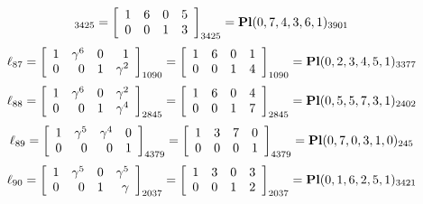 \documentclass{article}
\begin{document}
{$$_{3425}
=
\left[
\begin{array}{*{4}c}
1  & 6  & 0  & 5\\
0  & 0  & 1  & 3\\
\end{array}
\right]_{3425}
={\rm\bf Pl}(0,7,4,3,6,1 )_{3901}$$
$$
\ell_{87} = 
\left[
\begin{array}{*{4}{r}}
1 & \gamma^{6} & 0 & 1\\
0 & 0 & 1 & \gamma^{2}\\
\end{array}
\right]
_{1090}
=
\left[
\begin{array}{*{4}c}
1  & 6  & 0  & 1\\
0  & 0  & 1  & 4\\
\end{array}
\right]_{1090}
={\rm\bf Pl}(0,2,3,4,5,1 )_{3377}$$
$$
\ell_{88} = 
\left[
\begin{array}{*{4}{r}}
1 & \gamma^{6} & 0 & \gamma^{2}\\
0 & 0 & 1 & \gamma^{4}\\
\end{array}
\right]
_{2845}
=
\left[
\begin{array}{*{4}c}
1  & 6  & 0  & 4\\
0  & 0  & 1  & 7\\
\end{array}
\right]_{2845}
={\rm\bf Pl}(0,5,5,7,3,1 )_{2402}$$
$$
\ell_{89} = 
\left[
\begin{array}{*{4}{r}}
1 & \gamma^{5} & \gamma^{4} & 0\\
0 & 0 & 0 & 1\\
\end{array}
\right]
_{4379}
=
\left[
\begin{array}{*{4}c}
1  & 3  & 7  & 0\\
0  & 0  & 0  & 1\\
\end{array}
\right]_{4379}
={\rm\bf Pl}(0,7,0,3,1,0 )_{245}$$
$$
\ell_{90} = 
\left[
\begin{array}{*{4}{r}}
1 & \gamma^{5} & 0 & \gamma^{5}\\
0 & 0 & 1 & \gamma \\
\end{array}
\right]
_{2037}
=
\left[
\begin{array}{*{4}c}
1  & 3  & 0  & 3\\
0  & 0  & 1  & 2\\
\end{array}
\right]_{2037}
={\rm\bf Pl}(0,1,6,2,5,1 )_{3421}$$
}
\end{document}
